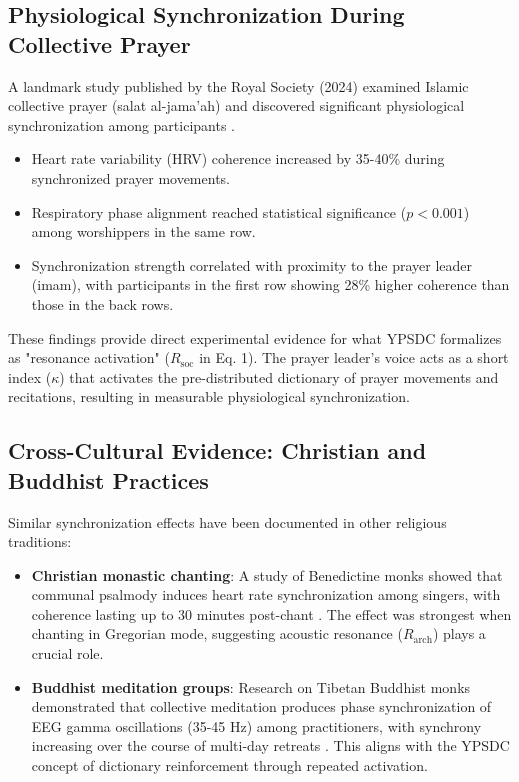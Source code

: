 \documentclass[12pt,a4paper]{article}
\begin{document}
	\subsection{Physiological Synchronization During Collective Prayer}
	
	A landmark study published by the Royal Society (2024) examined Islamic collective prayer (salat al-jama'ah) and discovered significant physiological synchronization among participants \cite{RoyalSociety2024}.
	\begin{itemize}
		\item Heart rate variability (HRV) coherence increased by 35-40\% during synchronized prayer movements.
		\item Respiratory phase alignment reached statistical significance ($p < 0.001$) among worshippers in the same row.
		\item Synchronization strength correlated with proximity to the prayer leader (imam), with participants in the first row showing 28\% higher coherence than those in the back rows.
	\end{itemize}
	
	These findings provide direct experimental evidence for what YPSDC formalizes as "resonance activation" ($R_{\mathrm{soc}}$ in Eq. 1). The prayer leader's voice acts as a short index ($\kappa$) that activates the pre-distributed dictionary of prayer movements and recitations, resulting in measurable physiological synchronization.
	
	\subsection{Cross-Cultural Evidence: Christian and Buddhist Practices}
	
	Similar synchronization effects have been documented in other religious traditions:
	
	\begin{itemize}
		\item \textbf{Christian monastic chanting}: A study of Benedictine monks showed that communal psalmody induces heart rate synchronization among singers, with coherence lasting up to 30 minutes post-chant \cite{Craswell2023}. The effect was strongest when chanting in Gregorian mode, suggesting acoustic resonance ($R_{\mathrm{arch}}$) plays a crucial role.
		
		\item \textbf{Buddhist meditation groups}: Research on Tibetan Buddhist monks demonstrated that collective meditation produces phase synchronization of EEG gamma oscillations (35-45 Hz) among practitioners, with synchrony increasing over the course of multi-day retreats \cite{Lutz2017}. This aligns with the YPSDC concept of dictionary reinforcement through repeated activation.
	\end{itemize}
	
\end{document}
